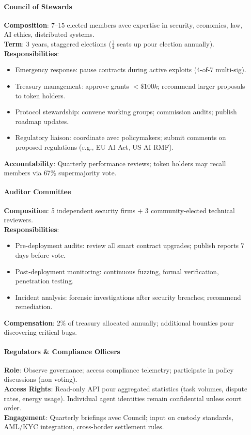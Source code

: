 \documentclass[11pt]{article}
\begin{document}
\paragraph{Council of Stewards}
\textbf{Composition}: 7--15 elected members avec expertise in security, economics, law, AI ethics, distributed systems.\\
\textbf{Term}: 3 years, staggered elections ($\frac{1}{3}$ seats up pour election annually).\\
\textbf{Responsibilities}:
\begin{itemize}[noitemsep]
  \item Emergency response: pause contracts during active exploits (4-of-7 multi-sig).
  \item Treasury management: approve grants $<\$100k$; recommend larger proposals to token holders.
  \item Protocol stewardship: convene working groups; commission audits; publish roadmap updates.
  \item Regulatory liaison: coordinate avec policymakers; submit comments on proposed regulations (e.g., EU AI Act, US AI RMF).
\end{itemize}
\textbf{Accountability}: Quarterly performance reviews; token holders may recall members via 67\% supermajority vote.

\paragraph{Auditor Committee}
\textbf{Composition}: 5 independent security firms + 3 community-elected technical reviewers.\\
\textbf{Responsibilities}:
\begin{itemize}[noitemsep]
  \item Pre-deployment audits: review all smart contract upgrades; publish reports 7 days before vote.
  \item Post-deployment monitoring: continuous fuzzing, formal verification, penetration testing.
  \item Incident analysis: forensic investigations after security breaches; recommend remediation.
\end{itemize}
\textbf{Compensation}: 2\% of treasury allocated annually; additional bounties pour discovering critical bugs.

\paragraph{Regulators \& Compliance Officers}
\textbf{Role}: Observe governance; access compliance telemetry; participate in policy discussions (non-voting).\\
\textbf{Access Rights}: Read-only API pour aggregated statistics (task volumes, dispute rates, energy usage). Individual agent identities remain confidential unless court order.\\
\textbf{Engagement}: Quarterly briefings avec Council; input on custody standards, AML/KYC integration, cross-border settlement rules.
\end{document}
